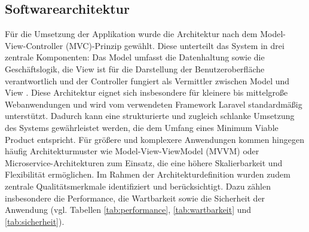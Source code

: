 \subsection{Softwarearchitektur}
Für die Umsetzung der Applikation wurde die Architektur nach dem Model-View-Controller (MVC)-Prinzip gewählt. 
Diese unterteilt das System in drei zentrale Komponenten: 
Das Model umfasst die Datenhaltung sowie die Geschäftslogik, die View ist für die Darstellung der Benutzeroberfläche verantwortlich und der Controller fungiert als Vermittler zwischen Model und View \parencite{mvc}.
\newline
Diese Architektur eignet sich insbesondere für kleinere bis mittelgroße Webanwendungen und wird vom verwendeten Framework Laravel standardmäßig unterstützt. 
Dadurch kann eine strukturierte und zugleich schlanke Umsetzung des Systems gewährleistet werden, die dem Umfang eines Minimum Viable Product entspricht.
\newline
Für größere und komplexere Anwendungen kommen hingegen häufig Architekturmuster wie Model-View-ViewModel (MVVM) oder Microservice-Architekturen zum Einsatz, die eine höhere Skalierbarkeit und Flexibilität ermöglichen.
\newline
Im Rahmen der Architekturdefinition wurden zudem zentrale Qualitätsmerkmale identifiziert und berücksichtigt. 
Dazu zählen insbesondere die Performance, die Wartbarkeit sowie die Sicherheit der Anwendung (vgl. Tabellen \ref{tab:performance}, \ref{tab:wartbarkeit} und \ref{tab:sicherheit}).
